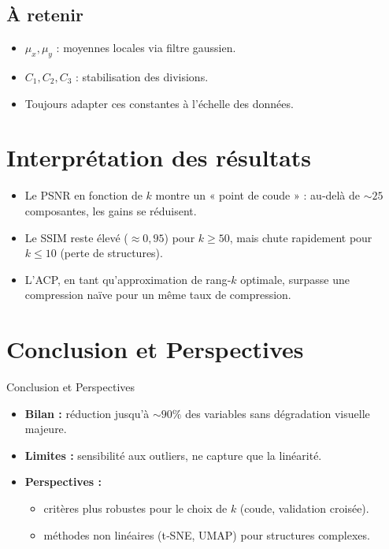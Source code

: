 \documentclass[a4paper,12pt]{report}
\begin{document}
\subsection*{À retenir}

\begin{itemize}
  \item $\mu_x,\mu_y$ : moyennes locales via filtre gaussien.
  \item $C_1,C_2,C_3$ : stabilisation des divisions.
  \item Toujours adapter ces constantes à l’échelle des données.
\end{itemize}

\section{Interprétation des résultats}

\begin{itemize}
  \item Le PSNR en fonction de $k$ montre un « point de coude » : au‐delà de $\sim25$ composantes, les gains se réduisent.
  \item Le SSIM reste élevé ($\approx0{,}95$) pour $k\ge50$, mais chute rapidement pour $k\le10$ (perte de structures).
  \item L’ACP, en tant qu’approximation de rang‐$k$ optimale, surpasse une compression naïve pour un même taux de compression.
\end{itemize}

\section{Conclusion et Perspectives}{Conclusion et Perspectives}

\begin{itemize}
  \item \textbf{Bilan :} réduction jusqu’à $\sim90\%$ des variables sans dégradation visuelle majeure.
  \item \textbf{Limites :} sensibilité aux outliers, ne capture que la linéarité.
  \item \textbf{Perspectives :} 
    \begin{itemize}
      \item critères plus robustes pour le choix de $k$ (coude, validation croisée).
      \item méthodes non linéaires (t‐SNE, UMAP) pour structures complexes.
    \end{itemize}
\end{itemize}
\end{document}
